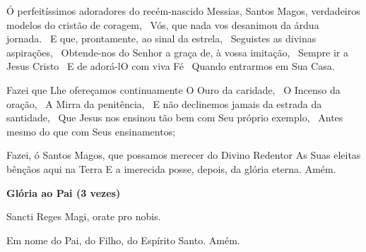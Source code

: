 \documentclass[18pt]{article}
\begin{document}
Ó perfeitíssimos adoradores do recém-nascido Messias,
Santos Magos, verdadeiros modelos do cristão de coragem, 
Vós, que nada vos desanimou da árdua jornada. 
E que, prontamente, ao sinal da estrela, 
Seguistes as divinas aspirações, 
Obtende-nos do Senhor a graça de, à vossa imitação, 
Sempre ir a Jesus Cristo 
E de adorá-lO com viva Fé 
Quando entrarmos em Sua Casa. 

Fazei que Lhe ofereçamos continuamente
O Ouro da caridade, 
O Incenso da oração, 
A Mirra da penitência, 
E não declinemos jamais da estrada da santidade, 
Que Jesus nos ensinou tão bem com Seu próprio exemplo, 
Antes mesmo do que com Seus ensinamentos;

Fazei, ó Santos Magos, que possamos merecer do Divino Redentor
As Suas eleitas bênçãos aqui na Terra
E a imerecida posse, depois, da glória eterna. Amém. 

\textbf{Glória ao Pai (3 vezes)}

Sancti Reges Magi, orate pro nobis. 

Em nome do Pai, do Filho, do Espírito Santo. Amém.
\end{document}
